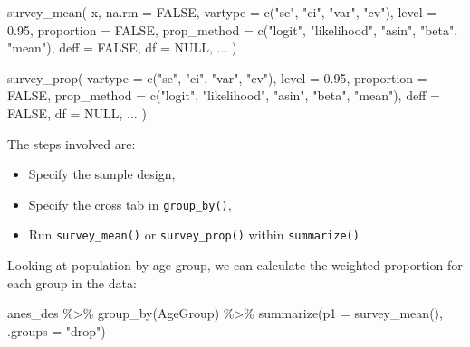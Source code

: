 \documentclass[
]{krantz}
\makeatletter
\newenvironment{Shaded}{\begin{snugshade}}{\end{snugshade}}
\newcommand{\AttributeTok}[1]{\textcolor[rgb]{0.61,0.61,0.61}{#1}}
\newcommand{\ConstantTok}[1]{\textcolor[rgb]{0,0,0}{#1}}
\newcommand{\FloatTok}[1]{\textcolor[rgb]{0.06,0.06,0.06}{#1}}
\newcommand{\FunctionTok}[1]{\textcolor[rgb]{0,0,0}{#1}}
\newcommand{\NormalTok}[1]{#1}
\newcommand{\SpecialCharTok}[1]{\textcolor[rgb]{0,0,0}{#1}}
\newcommand{\StringTok}[1]{\textcolor[rgb]{0.5,0.5,0.5}{#1}}
\providecommand{\tightlist}{%
  \setlength{\itemsep}{0pt}\setlength{\parskip}{0pt}}
\newenvironment{kframe}{%
\medskip{}
\setlength{\fboxsep}{.8em}
 \def\at@end@of@kframe{}%
 \ifinner\ifhmode%
  \def\at@end@of@kframe{\end{minipage}}%
  \begin{minipage}{\columnwidth}%
 \fi\fi%
 \def\FrameCommand##1{\hskip\@totalleftmargin \hskip-\fboxsep
 \colorbox{shadecolor}{##1}\hskip-\fboxsep
     \hskip-\linewidth \hskip-\@totalleftmargin \hskip\columnwidth}%
 \MakeFramed {\advance\hsize-\width
   \@totalleftmargin\z@ \linewidth\hsize
   \@setminipage}}%
 {\par\unskip\endMakeFramed%
 \at@end@of@kframe}
\renewenvironment{Shaded}{\begin{kframe}}{\end{kframe}}
\makeatother
\begin{document}
\begin{Shaded}
\begin{Highlighting}[]
\FunctionTok{survey\_mean}\NormalTok{(}
\NormalTok{  x,}
  \AttributeTok{na.rm =} \ConstantTok{FALSE}\NormalTok{,}
  \AttributeTok{vartype =} \FunctionTok{c}\NormalTok{(}\StringTok{"se"}\NormalTok{, }\StringTok{"ci"}\NormalTok{, }\StringTok{"var"}\NormalTok{, }\StringTok{"cv"}\NormalTok{),}
  \AttributeTok{level =} \FloatTok{0.95}\NormalTok{,}
  \AttributeTok{proportion =} \ConstantTok{FALSE}\NormalTok{,}
  \AttributeTok{prop\_method =} \FunctionTok{c}\NormalTok{(}\StringTok{"logit"}\NormalTok{, }\StringTok{"likelihood"}\NormalTok{, }\StringTok{"asin"}\NormalTok{, }\StringTok{"beta"}\NormalTok{, }\StringTok{"mean"}\NormalTok{),}
  \AttributeTok{deff =} \ConstantTok{FALSE}\NormalTok{,}
  \AttributeTok{df =} \ConstantTok{NULL}\NormalTok{,}
\NormalTok{  ...}
\NormalTok{)}

\FunctionTok{survey\_prop}\NormalTok{(}
  \AttributeTok{vartype =} \FunctionTok{c}\NormalTok{(}\StringTok{"se"}\NormalTok{, }\StringTok{"ci"}\NormalTok{, }\StringTok{"var"}\NormalTok{, }\StringTok{"cv"}\NormalTok{),}
  \AttributeTok{level =} \FloatTok{0.95}\NormalTok{,}
  \AttributeTok{proportion =} \ConstantTok{FALSE}\NormalTok{,}
  \AttributeTok{prop\_method =} \FunctionTok{c}\NormalTok{(}\StringTok{"logit"}\NormalTok{, }\StringTok{"likelihood"}\NormalTok{, }\StringTok{"asin"}\NormalTok{, }\StringTok{"beta"}\NormalTok{, }\StringTok{"mean"}\NormalTok{),}
  \AttributeTok{deff =} \ConstantTok{FALSE}\NormalTok{,}
  \AttributeTok{df =} \ConstantTok{NULL}\NormalTok{,}
\NormalTok{  ...}
\NormalTok{)}
\end{Highlighting}
\end{Shaded}

The steps involved are:

\begin{itemize}
\tightlist
\item
  Specify the sample design,
\item
  Specify the cross tab in \texttt{group\_by()},
\item
  Run \texttt{survey\_mean()} or \texttt{survey\_prop()} within \texttt{summarize()}
\end{itemize}

Looking at population by age group, we can calculate the weighted proportion for each group in the data:

\begin{Shaded}
\begin{Highlighting}[]
\NormalTok{anes\_des }\SpecialCharTok{\%\textgreater{}\%}
  \FunctionTok{group\_by}\NormalTok{(AgeGroup) }\SpecialCharTok{\%\textgreater{}\%}
  \FunctionTok{summarize}\NormalTok{(}\AttributeTok{p1 =} \FunctionTok{survey\_mean}\NormalTok{(),}
            \AttributeTok{.groups =} \StringTok{"drop"}\NormalTok{)}
\end{Highlighting}
\end{Shaded}
\end{document}
